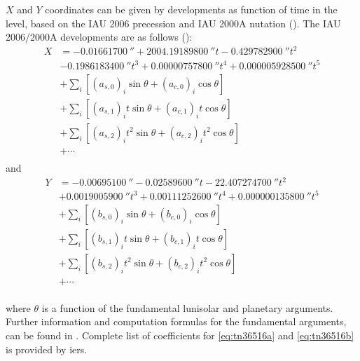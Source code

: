 $X$ and $Y$ coordinates can be given by developments as function of time in the 
\si{\micro\larcsecond} level, based on the IAU 2006 precession and IAU 2000A
nutation (\cite{Capitaine2006a}).
The IAU 2006/2000A developments are as follows (\cite{iers2010}):
\begin{equation}
  \label{eq:tn36516a}
  \begin{aligned}
  X &= \SI{-0.01661700}{\arcsecond} + \SI{2004.19189800}{\arcsecond} t - \SI{0.429782900}{\arcsecond} t^2 \\
  &- \SI{0.1986183400}{\arcsecond}t^3 + \SI{0.00000757800}{\arcsecond} t^4 + \SI{0.000005928500}{\arcsecond} t^5 \\
  &+ \sum_{i} \left[ (a_{s,0})_i \sin \theta + (a_{c,0})_i \cos \theta \right] \\ 
  &+ \sum_{i} \left[ (a_{s,1})_i t \sin \theta + (a_{c,1})_i t \cos \theta \right] \\ 
  &+ \sum_{i} \left[ (a_{s,2})_i t^2 \sin \theta + (a_{c,2})_i t^2 \cos \theta \right] \\ 
  &+ \cdots \\
  \end{aligned}
\end{equation}
and
\begin{equation}
  \label{eq:tn36516b}
  \begin{aligned}
  Y &= -\SI{0.00695100}{\arcsecond} - \SI{0.02589600}{\arcsecond} t - \SI{22.407274700}{\arcsecond} t^2 \\
  &+ \SI{0.0019005900}{\arcsecond} t^3 + \SI{0.00111252600}{\arcsecond} t^4 + \SI{0.000000135800}{\arcsecond} t^5 \\
  &+ \sum_{i} \left[ (b_{s,0})_i \sin \theta     + (b_{c,0})_i \cos \theta \right] \\ 
  &+ \sum_{i} \left[ (b_{s,1})_i t \sin \theta   + (b_{c,1})_i t \cos \theta \right] \\ 
  &+ \sum_{i} \left[ (b_{s,2})_i t^2 \sin \theta + (b_{c,2})_i t^2 \cos \theta \right] \\ 
  &+ \cdots \\
  \end{aligned}
\end{equation}

where $\theta$ is a function of the fundamental lunisolar and planetary arguments.
Further information and computation formulas for the fundamental arguments, 
can be found in \cite{iers2010}. Complete 
list of coefficients for \autoref{eq:tn36516a} and \autoref{eq:tn36516b} is provided 
by \gls{iers}. 

